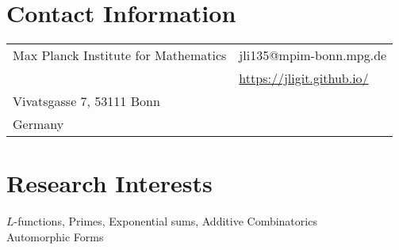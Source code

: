 \documentclass[margin,line,pifont,palatino,courier]{res}
\begin{document}

\begin{resume}

\section{\sc Contact Information}
%


\vspace{.05in}
\begin{tabular}{@{}p{2.5in}p{2.5in}}
Max Planck Institute   for Mathematics                 & \hfill{jli135@mpim-bonn.mpg.de}\\

 & \hfill{\href{https://jligit.github.io/}{https://jligit.github.io/}}\\

Vivatsgasse 7,
53111 Bonn
             & \\
Germany   & 

\end{tabular}

\section{\sc Research Interests}
$L$-functions, Primes,  Exponential sums, Additive Combinatorics\\
Automorphic Forms

\end{resume}
\end{document}
